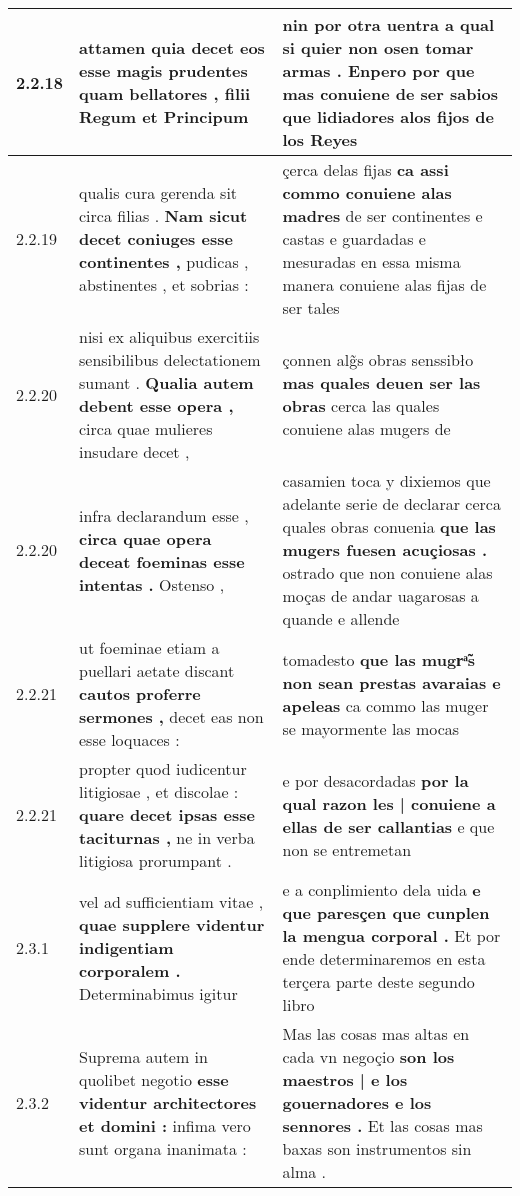 \begin{tabular}{|p{1cm}|p{6.5cm}|p{6.5cm}|}
2.2.18 & attamen quia decet \textbf{ eos esse magis prudentes quam bellatores , } filii Regum et Principum & nin por otra uentra a qual si quier non osen tomar armas . \textbf{ Enpero por que mas conuiene de ser sabios } que lidiadores alos fijos de los Reyes \\\hline
2.2.19 & qualis cura gerenda sit circa filias . \textbf{ Nam sicut decet coniuges esse continentes , } pudicas , abstinentes , et sobrias : & çerca delas fijas \textbf{ ca assi commo conuiene alas madres } de ser continentes e castas e guardadas e mesuradas en essa misma manera conuiene alas fijas de ser tales \\\hline
2.2.20 & nisi ex aliquibus exercitiis sensibilibus delectationem sumant . \textbf{ Qualia autem debent esse opera , } circa quae mulieres insudare decet , & çonnen alg̃s obras senssibło \textbf{ mas quales deuen ser las obras } cerca las quales conuiene alas mugers de \\\hline
2.2.20 & infra declarandum esse , \textbf{ circa quae opera deceat foeminas esse intentas . } Ostenso , & casamien toca y dixiemos que adelante serie de declarar cerca quales obras conuenia \textbf{ que las mugers fuesen acuçiosas . } ostrado que non conuiene alas moças de andar uagarosas a quande e allende \\\hline
2.2.21 & ut foeminae etiam a puellari aetate discant \textbf{ cautos proferre sermones , } decet eas non esse loquaces : & tomadesto \textbf{ que las mugrͣ̃s non sean prestas avaraias e apeleas } ca commo las muger se mayormente las mocas \\\hline
2.2.21 & propter quod iudicentur litigiosae , et discolae : \textbf{ quare decet ipsas esse taciturnas , } ne in verba litigiosa prorumpant . & e por desacordadas \textbf{ por la qual razon les | conuiene a ellas de ser callantias } e que non se entremetan \\\hline
2.3.1 & vel ad sufficientiam vitae , \textbf{ quae supplere videntur indigentiam corporalem . } Determinabimus igitur & e a conplimiento dela uida \textbf{ e que paresçen que cunplen la mengua corporal . } Et por ende determinaremos en esta terçera parte deste segundo libro \\\hline
2.3.2 & Suprema autem in quolibet negotio \textbf{ esse videntur architectores et domini : } infima vero sunt organa inanimata : & Mas las cosas mas altas en cada vn negoçio \textbf{ son los maestros | e los gouernadores e los sennores . } Et las cosas mas baxas son instrumentos sin alma . \\\hline

\end{tabular}
